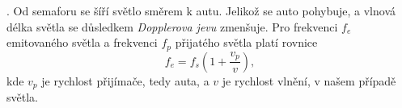 \documentclass{../../../../style/mkimain}
\begin{document}
\noindent{}
.
\klein
Od semaforu se šíří světlo směrem k autu. Jelikož se auto pohybuje, a vlnová délka světla se důsledkem \emph{Dopplerova jevu} zmenšuje.
Pro frekvenci $f_e$ emitovaného světla a frekvenci $f_p$ přijatého světla platí rovnice
$$f_e=f_s\left(1+\frac{v_p}{v}\right),$$
kde $v_p$ je rychlost přijímače, tedy auta, a $v$ je rychlost vlnění, v našem případě světla.
\end{document}
